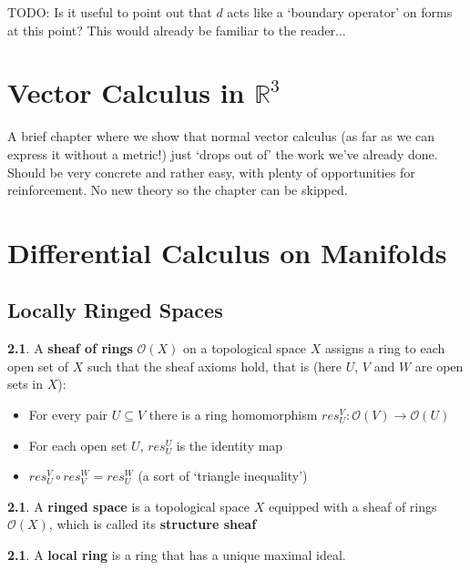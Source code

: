 \documentclass[oneside,english]{amsbook}
\numberwithin{section}{chapter}
\theoremstyle{plain}
\theoremstyle{definition}
\newtheorem{defn}[thm]{\protect\definitionname}
\providecommand{\definitionname}{Definition}
\begin{document}
			TODO: Is it useful to point out that $d$ acts like a `boundary operator' on forms at this point? This would already be familiar to the reader...
			
	\chapter{Vector Calculus in $\mathbb{R}^3$}

		A brief chapter where we show that normal vector calculus (as far as we can express it without a metric!) just `drops out of' the work we've already done. Should be very concrete and rather easy, with plenty of opportunities for reinforcement. No new theory so the chapter can be skipped.

	\chapter{Differential Calculus on Manifolds}
	
		\section{Locally Ringed Spaces}

			\begin{defn} 
				A \textbf{sheaf of rings} $\mathscr{O}(X)$ on a topological space $X$ assigns a ring to each open set of $X$ such that the sheaf axioms hold, that is (here $U$, $V$ and $W$ are open sets in $X$):
				\begin{itemize}
					\item For every pair $U\subseteq V$ there is a ring homomorphism $res_U^V: \mathscr{O}(V)\to \mathscr{O}(U)$
					\item For each open set $U$, $res_U^U$ is the identity map
					\item $res_U^V \circ res_V^W = res_U^W$ (a sort of `triangle inequality')
				\end{itemize}
			\end{defn}
			
			\begin{defn} 
				A \textbf{ringed space} is a topological space $X$ equipped with a sheaf of rings $\mathscr{O}(X)$, which is called its \textbf{structure sheaf}
			\end{defn}
			
			\begin{defn} 
				A \textbf{local ring} is a ring that has a unique maximal ideal.
			\end{defn}
			
\end{document}
